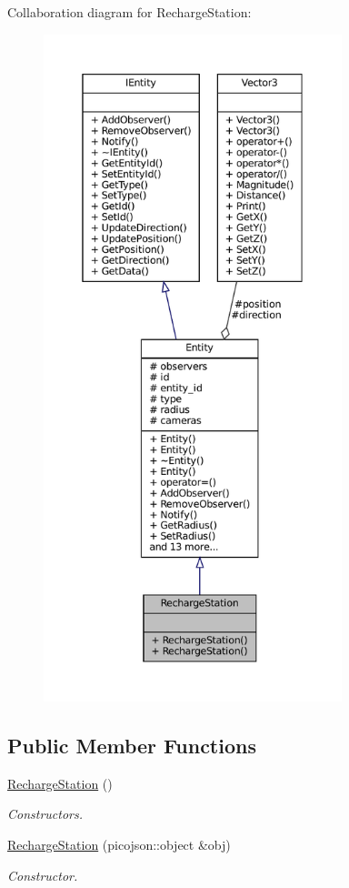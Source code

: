 Collaboration diagram for Recharge\+Station\+:\nopagebreak
\begin{figure}[H]
\begin{center}
\leavevmode
\includegraphics[height=550pt]{classRechargeStation__coll__graph}
\end{center}
\end{figure}
\subsection*{Public Member Functions}
\begin{DoxyCompactItemize}
\item 
\mbox{\label{classRechargeStation_a2e5f2604cca1d47994be5572b6d6c439}} 
\hyperlink{classRechargeStation_a2e5f2604cca1d47994be5572b6d6c439}{Recharge\+Station} ()
\begin{DoxyCompactList}\small\item\em Constructors. \end{DoxyCompactList}\item 
\hyperlink{classRechargeStation_af9b5963a59390ab4d93263d97e194622}{Recharge\+Station} (picojson\+::object \&obj)
\begin{DoxyCompactList}\small\item\em Constructor. \end{DoxyCompactList}\end{DoxyCompactItemize}
